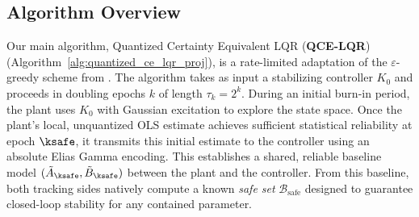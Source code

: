 \documentclass[11pt,journal,onecolumn]{IEEEtran}
\begin{document}
\subsection{Algorithm Overview}
\label{sec:algorithm-overview}

Our main algorithm, Quantized Certainty Equivalent LQR (\textbf{QCE-LQR}) (Algorithm~\ref{alg:quantized_ce_lqr_proj}), is a rate-limited adaptation of the $\varepsilon$-greedy scheme from \cite{simchowitz20a}. The algorithm takes as input a stabilizing controller $K_0$ and proceeds in doubling epochs $k$ of length $\tau_k = 2^k$. During an initial burn-in period, the plant uses $K_0$ with Gaussian excitation to explore the state space. Once the plant's local, unquantized OLS estimate achieves sufficient statistical reliability at epoch $\ksafe$, it transmits this initial estimate to the controller using an absolute Elias Gamma encoding. This establishes a shared, reliable baseline model $(\tilde A_{\ksafe}, \tilde B_{\ksafe})$ between the plant and the controller. From this baseline, both tracking sides natively compute a known \emph{safe set} $\mathcal{B}_{\mathrm{safe}}$ designed to guarantee closed-loop stability for any contained parameter.
\end{document}
